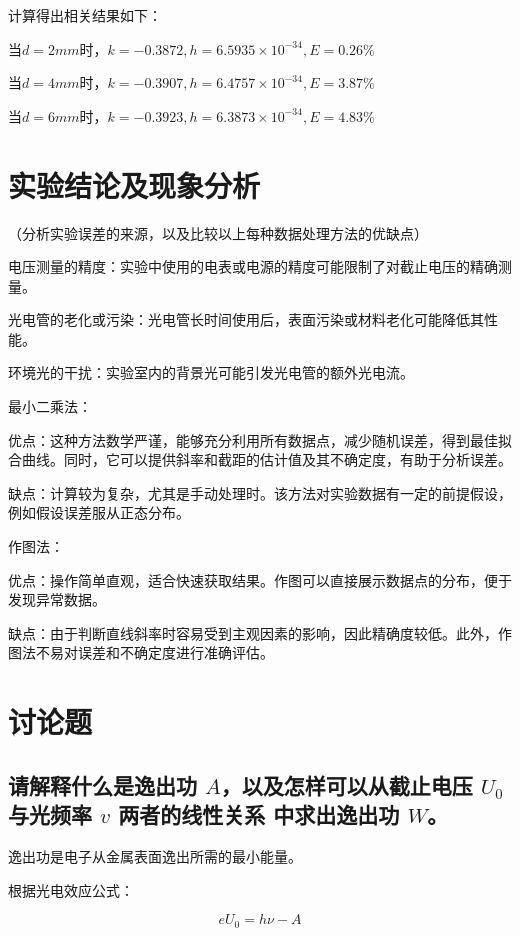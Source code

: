 \documentclass[signature=data]{physicsreport}
\begin{document}
计算得出相关结果如下：

当$d=2mm$时，$k=-0.3872,h=6.5935\times10^{-34},E=0.26\%$

当$d=4mm$时，$k=-0.3907,h=6.4757\times10^{-34},E=3.87\%$

当$d=6mm$时，$k=-0.3923,h=6.3873\times10^{-34},E=4.83\%$



\section{实验结论及现象分析}
（分析实验误差的来源，以及比较以上每种数据处理方法的优缺点）



电压测量的精度：实验中使用的电表或电源的精度可能限制了对截止电压的精确测量。

光电管的老化或污染：光电管长时间使用后，表面污染或材料老化可能降低其性能。

环境光的干扰：实验室内的背景光可能引发光电管的额外光电流。



最小二乘法：

优点：这种方法数学严谨，能够充分利用所有数据点，减少随机误差，得到最佳拟合曲线。同时，它可以提供斜率和截距的估计值及其不确定度，有助于分析误差。

缺点：计算较为复杂，尤其是手动处理时。该方法对实验数据有一定的前提假设，例如假设误差服从正态分布。

作图法：

优点：操作简单直观，适合快速获取结果。作图可以直接展示数据点的分布，便于发现异常数据。

缺点：由于判断直线斜率时容易受到主观因素的影响，因此精确度较低。此外，作图法不易对误差和不确定度进行准确评估。



\section{讨论题}

\subsection{请解释什么是逸出功 $A$，以及怎样可以从截止电压 $U_0$ 与光频率 $v$ 两者的线性关系
中求出逸出功 $W$。}

逸出功是电子从金属表面逸出所需的最小能量。

根据光电效应公式：

$$
e U_0 = h \nu - A
$$
\end{document}
